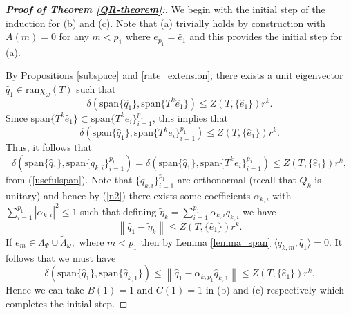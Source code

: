 \documentclass[a4paper,10pt]{article}
\begin{document}
\begin{proof}[\textbf{Proof of Theorem \ref{QR-theorem}}:]

We begin with the initial step of the induction for (b) and (c). Note that (a) trivially holds by construction with $A(m)=0$ for any $m<p_1$ where $e_{p_1}=\hat e_{1}$ and this provides the initial step for (a).

By Propositions \ref{subspace} and \ref{rate_extension}, there exists a unit eigenvector $\hat q_1\in\mathrm{ran}\chi_{\omega}(T)$ such that
$$
\delta(\mathrm{span}\{\hat q_1\},\mathrm{span}\{T^k \hat e_1\})\leq Z(T,\{\hat e_1\})r^k.
$$
Since $\mathrm{span}\{T^k\hat  e_1\}\subset  \mathrm{span}\{T^ke_i\}_{i=1}^{p_1}$, this implies that
$$
\delta( \mathrm{span}\{\hat q_1\}, \mathrm{span}\{T^ke_i\}_{i=1}^{p_1}) \leq Z(T,\{\hat e_1\})r^k.
$$
Thus, it follows that 
\begin{equation}\label{n2}
\delta(\mathrm{span}\{\hat q_1\},\mathrm{span}\{q_{k,i}\}_{i=1}^{p_1}) =
\delta( \mathrm{span}\{\hat q_1\},\mathrm{span}\{T^ke_i\}_{i=1}^{p_1}) \leq Z(T,\{\hat e_1\})r^k,
\end{equation}  
from (\ref{usefulspan}). Note that $\{q_{k,i}\}_{i=1}^{p_1}$ are orthonormal (recall that $Q_k$ is unitary) and hence by (\ref{n2}) there exists some coefficients $\alpha_{k,i}$ with $\sum_{i=1}^{p_1}|\alpha_{k,i}|^2 \leq 1$ such that defining $\tilde \eta_k =  \sum_{i=1}^{p_1}\alpha_{k,i}q_{k,i}$ we have
\begin{equation}
\label{eta_approx2}
\left\|\hat q_1-\tilde \eta_k\right\|\leq Z(T,\{\hat e_1\})r^k.
\end{equation}
If $e_m \in \Lambda_{\Psi} \cup  \tilde \Lambda_{\omega},$ where $m < {p_1}$ then by Lemma \ref{lemma_span} $\langle q_{k,m},\hat q_1\rangle=0$. It follows that we must have
$$
\delta(\mathrm{span}\{\hat q_1\},\mathrm{span}\{\hat q_{k,1}\})\leq\left\|\hat q_1-\alpha_{k,p_1}\hat q_{k,1}\right\|\leq Z(T,\{\hat e_1\})r^k.
$$
Hence we can take $B(1)=1$ and $C(1)=1$ in (b) and (c) respectively which completes the initial step.



\end{proof}
\end{document}
